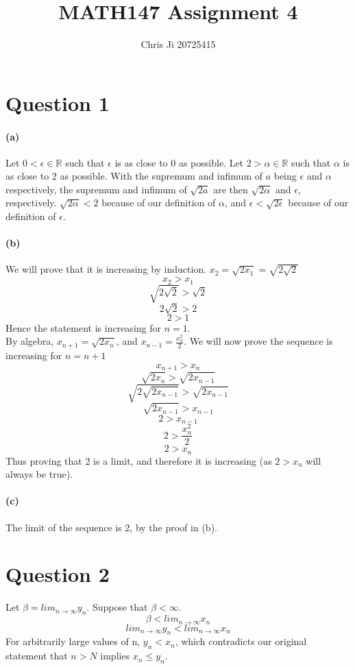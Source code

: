 \documentclass[10pt,letter]{article}
\begin{document}
\title{MATH147 Assignment 4}
\author{Chris Ji 20725415}

\maketitle 

\section*{Question 1}

\paragraph{(a)}
Let $0 < \epsilon \in \mathbb{R}$ such that $\epsilon$ is as close to $0$ as possible. Let $2 > \alpha \in \mathbb{R}$ such that $\alpha$ is as close to $2$ as possible. With the supremum and infimum of $a$ being $\epsilon$ and $\alpha$ respectively, the supremum and infimum of $\sqrt{2a}$ are then $\sqrt{2\alpha}$ and $\epsilon$, respectively. $\sqrt{2\alpha} < 2$ because of our definition of $\alpha$, and $\epsilon < \sqrt{2\epsilon}$ because of our definition of $\epsilon$. 

\paragraph{(b)} 
We will prove that it is increasing by induction. $x_2 = \sqrt{2x_{1}} = \sqrt{2\sqrt{2}}$ 
$$x_2 > x_1$$
$$\sqrt{2\sqrt{2}} > \sqrt{2}$$
$$2\sqrt{2} > 2$$
$$2 > 1$$
Hence the statement is increasing for $n = 1$. \\ 
By algebra, $x_{n+1} = \sqrt{2x_n}$, and $x_{n-1} = \frac{x^{2}_n}{2}$. We will now prove the sequence is increasing for $n = n + 1$
$$x_{n+1} > x_n$$
$$\sqrt{2x_n} > \sqrt{2x_{n-1}}$$
$$\sqrt{2\sqrt{2x_{n-1}}} > \sqrt{2x_{n-1}}$$
$$\sqrt{2x_{n-1}} > x_{n-1}$$
$$2 > x_{n-1}$$
$$2 > \frac{x^{2}_n}{2}$$
$$2 > x_n$$
Thus proving that 2 is a limit, and therefore it is increasing (as $2 > x_n$ will always be true).

\paragraph{(c)} The limit of the sequence is 2, by the proof in (b).


\section*{Question 2}
Let $\beta = lim_{n\rightarrow\infty}y_n$. Suppose that $\beta < \infty$.
$$\beta < lim_{n\rightarrow\infty}x_n$$
$$lim_{n\rightarrow\infty}y_n < lim_{n\rightarrow\infty}x_n$$
For arbitrarily large values of n, $y_n < x_n$, which contradicts our original statement that $n > N$ implies $x_n \leq y_n$. 
\end{document}
